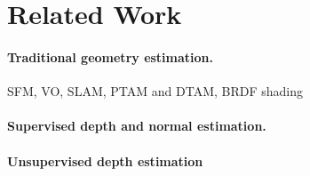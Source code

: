 \section{Related Work}

\paragraph{Traditional geometry estimation.} SFM, VO, SLAM, PTAM and DTAM,  BRDF shading

\paragraph{Supervised depth and normal estimation.}

\paragraph{Unsupervised depth estimation }
